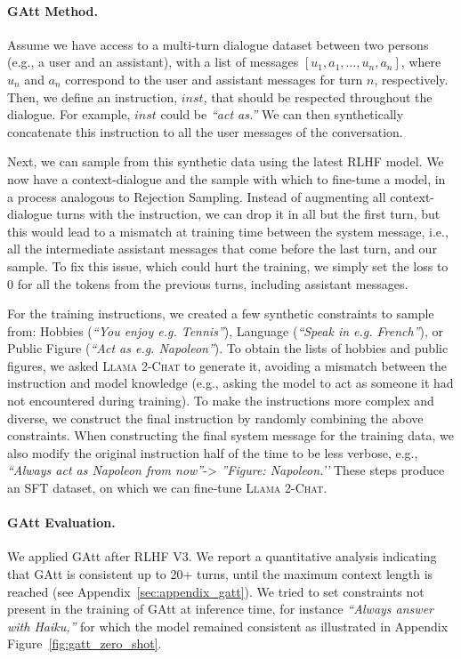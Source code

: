 \paragraph{GAtt Method.} Assume we have access to a multi-turn dialogue dataset between two persons (e.g., a user and an assistant), with a list of messages $[u_1, a_1, \ldots, u_n, a_n]$, where $u_n$ and $a_n$ correspond to the user and assistant messages for turn $n$, respectively. Then, we define an instruction, $inst$, that should be respected throughout the dialogue. For example, $inst$ could be \textit{``act as.''} We can then synthetically concatenate this instruction to all the user messages of the conversation.

Next, we can sample from this synthetic data using the latest RLHF model. We now have a context-dialogue and the sample with which to fine-tune a model, in a process analogous to Rejection Sampling. Instead of augmenting all context-dialogue turns with the instruction, we can drop it in all but the first turn, but this would lead to a mismatch at training time between the system message, i.e., all the intermediate assistant messages that come before the last turn, and our sample. To fix this issue, which could hurt the training, we simply set the loss to 0 for all the tokens from the previous turns, including assistant messages.

For the training instructions, we created a few synthetic constraints to sample from: Hobbies (\textit{``You enjoy e.g. Tennis''}),  Language (\textit{``Speak in e.g. French''}), or Public Figure (\textit{``Act as e.g. Napoleon''}). To obtain the lists of hobbies and public figures, we asked \textsc{Llama 2-Chat} to generate it, avoiding a mismatch between the instruction and model knowledge (e.g., asking the model to act as someone it had not encountered during training). To make the instructions more complex and diverse, we construct the final instruction by randomly combining the above constraints. When constructing the final system message for the training data, we also modify the original instruction half of the time to be less verbose, e.g., \textit{``Always act as Napoleon from now''}-> \textit{''Figure: Napoleon.’’} These steps produce an SFT dataset, on which we can fine-tune \textsc{Llama 2-Chat}. 

\paragraph{GAtt Evaluation.} We applied GAtt after RLHF V3. We report a quantitative analysis indicating that GAtt is consistent up to 20+ turns, until the maximum context length is reached (see Appendix~\ref{sec:appendix_gatt}). We tried to set constraints not present in the training of GAtt at inference time, for instance \textit{``Always answer with Haiku,''} for which the model remained consistent as illustrated in Appendix Figure~\ref{fig:gatt_zero_shot}. 


